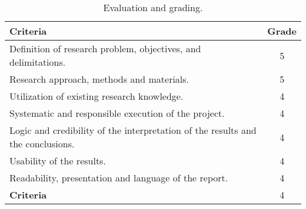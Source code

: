 \documentclass{lutmscthesis}[2010/09/22]
\begin{document}
\begin{table}[hpt]
\begin{center}
\caption{Evaluation and grading.\label{tab:eval}}
{\renewcommand{\arraystretch}{2}
\begin{tabular}{| l | c |}

\hline
\textbf{Criteria}
&
\textbf{Grade} \\
\hline

Definition of research problem, objectives, and delimitations. & 5 \\
\hline
Research approach, methods and materials. & 5 \\
\hline
Utilization of existing research knowledge. & 4 \\
\hline
Systematic and responsible execution of the project. & 4 \\
\hline
Logic and credibility of the interpretation of the results and the conclusions. & 4 \\
\hline
Usability of the results. & 4 \\
\hline
Readability, presentation and language of the report. & 4 \\
\hline
\textbf{Criteria} & 4 \\
\hline


\end{tabular}}
\end{center}
\end{table}
\end{document}
